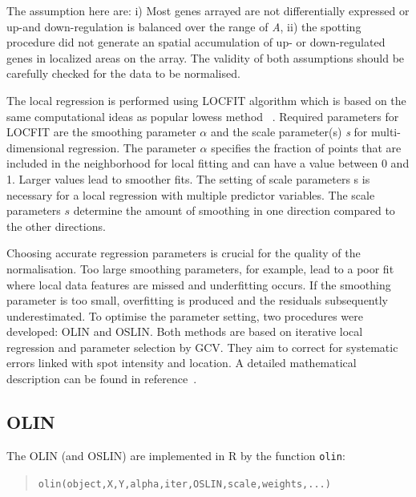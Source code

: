 \documentclass[a4paper,11pt]{article}
\begin{document}
 The assumption here are: i) Most genes arrayed are not differentially expressed or 
up-and down-regulation is balanced over the range of \emph{A},  ii) the spotting procedure did not generate an spatial accumulation of up- or down-regulated genes in localized areas on the array. 
The validity of both assumptions  should be carefully checked for the data to be normalised. 


The local regression is performed using LOCFIT algorithm which is based on the same 
computational ideas as popular lowess method~\cite{loader,cleveland} .  Required parameters for LOCFIT 
are the smoothing parameter $\alpha$  and the scale parameter(s) \emph{s}
for multi-dimensional regression.
The parameter $\alpha$  specifies the fraction of points that are included in the neighborhood for 
local fitting  and can have a  value between 0 and 1. Larger  values lead to smoother fits.  
The setting of scale parameters s is necessary for a local regression with multiple  
predictor variables. The scale parameters $s$  determine the  amount of smoothing in one direction 
compared to the other directions.   


Choosing accurate regression parameters is crucial for the quality of the normalisation. 
Too large smoothing parameters, for example, lead to a poor fit where local data features are missed
and underfitting occurs.  If the smoothing parameter is too small,  overfitting is produced and
the residuals subsequently underestimated. 
To optimise the parameter setting, two procedures were developed: OLIN and OSLIN. Both methods
are based  on iterative local regression and parameter selection by GCV.
 They aim to correct for systematic errors linked with spot intensity and location. A detailed mathematical description can be found in reference~\cite{toni}.


\subsection{OLIN}
The OLIN (and OSLIN) are implemented in R by the function \texttt{olin}:

\begin{quote}
\texttt{olin(object,X,Y,alpha,iter,OSLIN,scale,weights,...)}
\end{quote}
\end{document}
